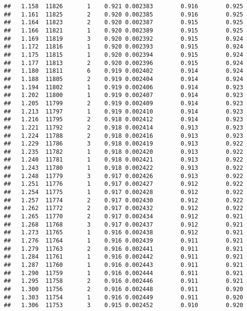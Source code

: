 \documentclass[
]{book}
\begin{document}
\begin{verbatim}
##   1.158  11826       1    0.921 0.002383        0.916        0.925
##   1.161  11825       2    0.920 0.002385        0.916        0.925
##   1.164  11823       2    0.920 0.002387        0.915        0.925
##   1.166  11821       1    0.920 0.002389        0.915        0.925
##   1.169  11819       3    0.920 0.002392        0.915        0.924
##   1.172  11816       1    0.920 0.002393        0.915        0.924
##   1.175  11815       1    0.920 0.002394        0.915        0.924
##   1.177  11813       2    0.920 0.002396        0.915        0.924
##   1.180  11811       6    0.919 0.002402        0.914        0.924
##   1.188  11805       2    0.919 0.002404        0.914        0.924
##   1.194  11802       1    0.919 0.002406        0.914        0.923
##   1.202  11800       1    0.919 0.002407        0.914        0.923
##   1.205  11799       2    0.919 0.002409        0.914        0.923
##   1.213  11797       1    0.919 0.002410        0.914        0.923
##   1.216  11795       2    0.918 0.002412        0.914        0.923
##   1.221  11792       2    0.918 0.002414        0.913        0.923
##   1.224  11788       2    0.918 0.002416        0.913        0.923
##   1.229  11786       3    0.918 0.002419        0.913        0.922
##   1.235  11782       1    0.918 0.002420        0.913        0.922
##   1.240  11781       1    0.918 0.002421        0.913        0.922
##   1.243  11780       1    0.918 0.002422        0.913        0.922
##   1.248  11779       3    0.917 0.002426        0.913        0.922
##   1.251  11776       1    0.917 0.002427        0.912        0.922
##   1.254  11775       1    0.917 0.002428        0.912        0.922
##   1.257  11774       2    0.917 0.002430        0.912        0.922
##   1.262  11772       2    0.917 0.002432        0.912        0.922
##   1.265  11770       2    0.917 0.002434        0.912        0.921
##   1.268  11768       3    0.917 0.002437        0.912        0.921
##   1.273  11765       1    0.916 0.002438        0.912        0.921
##   1.276  11764       1    0.916 0.002439        0.911        0.921
##   1.279  11763       2    0.916 0.002441        0.911        0.921
##   1.284  11761       1    0.916 0.002442        0.911        0.921
##   1.287  11760       1    0.916 0.002443        0.911        0.921
##   1.290  11759       1    0.916 0.002444        0.911        0.921
##   1.295  11758       2    0.916 0.002446        0.911        0.921
##   1.300  11756       2    0.916 0.002448        0.911        0.920
##   1.303  11754       1    0.916 0.002449        0.911        0.920
##   1.306  11753       3    0.915 0.002452        0.910        0.920

\end{verbatim}
\end{document}
